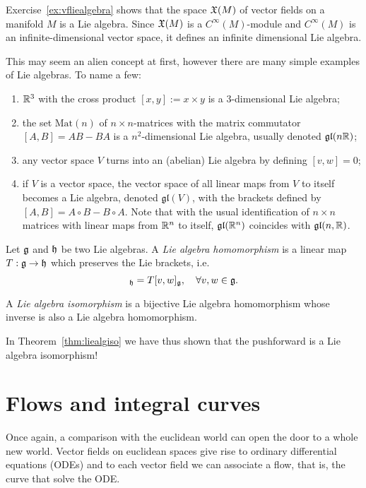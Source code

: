 \begin{example}
  Exercise~\ref{ex:vfliealgebra} shows that the space $\mathfrak{X}(M)$ of vector fields on a manifold $M$ is a Lie algebra.
  Since $\mathfrak{X}(M)$ is a $C^\infty(M)$-module and $C^\infty(M)$ is an infinite-dimensional vector space, it defines an infinite dimensional Lie algebra.

  This may seem an alien concept at first, however there are many simple examples of Lie algebras. To name a few:
  \begin{enumerate}
    \item $\mathbb{R}^3$ with the cross product $[x,y]:=x\times y$ is a $3$-dimensional Lie algebra;
    \item the set $\mathrm{Mat}(n)$ of $n\times n$-matrices with the matrix commutator $[A,B] = AB-BA$ is a $n^2$-dimensional Lie algebra, usually denoted $\mathfrak{gl}(n\mathbb{R})$;
    \item any vector space $V$ turns into an (abelian) Lie algebra by defining $[v,w]=0$;
    \item if $V$ is a vector space, the vector space of all linear maps from $V$ to itself becomes a Lie algebra, denoted $\mathfrak{gl}(V)$, with the brackets defined by $[A,B] = A\circ B-B\circ A$. Note that with the usual identification of $n\times n$ matrices with linear maps from $\mathbb{R}^n$ to itself, $\mathfrak{gl}(\mathbb{R}^n)$ coincides with $\mathfrak{gl}(n, \mathbb{R})$.
  \end{enumerate}
\end{example}

\begin{definition}
  Let $\mathfrak{g}$ and $\mathfrak{h}$ be two Lie algebras. A \emph{Lie algebra homomorphism} is a linear map $T:\mathfrak{g}\to\mathfrak{h}$ which preserves the Lie brackets, i.e.
  \begin{equation}
    [Tv, Tw]_\fh = T[v,w]_\fg, \quad \forall v,w\in\fg.
  \end{equation}

  A \emph{Lie algebra isomorphism} is a bijective Lie algebra homomorphism whose inverse is also a Lie algebra homomorphism.
\end{definition}

In Theorem~\ref{thm:liealgiso} we have thus shown that the pushforward is a Lie algebra isomorphism!

\section{Flows and integral curves}

Once again, a comparison with the euclidean world can open the door to a whole new world.
Vector fields on euclidean spaces give rise to ordinary differential equations (ODEs) and to each vector field we can associate a flow, that is, the curve that solve the ODE.

